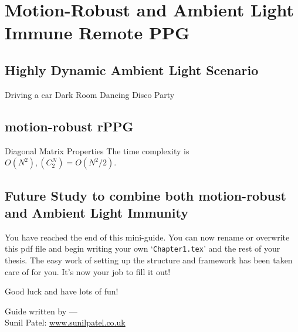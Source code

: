 \chapter{Motion-Robust and Ambient Light Immune Remote PPG} %

\label{Chapter7} %


\section{Highly Dynamic Ambient Light Scenario}
Driving a car
Dark Room
Dancing Disco Party

\section{motion-robust rPPG}

\begin{compactitem}

\item Diagonal Matrix Properties
The time complexity is $O(N^2),  (C_2^N) = O(N^2/2)$.
\end{compactitem}

\section{Future Study to combine both motion-robust and Ambient Light Immunity}

You have reached the end of this mini-guide. You can now rename or overwrite this pdf file and begin writing your own `\texttt{Chapter1.tex}' and the rest of your thesis. The easy work of setting up the structure and framework has been taken care of for you. It's now your job to fill it out!

Good luck and have lots of fun!

\begin{flushright}
Guide written by ---\\
Sunil Patel: \href{http://www.sunilpatel.co.uk}{www.sunilpatel.co.uk}
\end{flushright}
